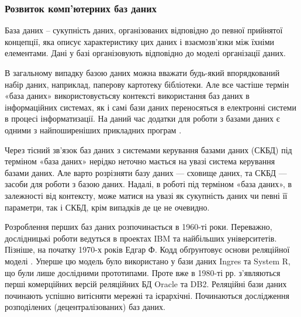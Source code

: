 \subsubsection{Розвиток комп’ютерних баз даних}

База даних – сукупність даних, організованих відповідно до певної прийнятої концепції, яка описує характеристику цих даних і взаємозв'язки між їхніми елементами. Дані у базі організовують відповідно до моделі організації даних. 

В загальному випадку базою даних можна вважати будь-який впорядкований набір даних, наприклад, паперову картотеку бібліотеки. Але все частіше термін «база даних» використовуєтьсяу контексті використання баз даних в інформаційних системах, як і самі бази даних переносяться в електронні системи в процесі інформатизації. На даний час додатки для роботи з базами даних є одними з найпоширеніших прикладних програм \cite{ситник2004проектування}.

Через тісний зв'язок баз даних з системами керування базами даних (СКБД) під терміном «база даних» нерідко неточно мається на увазі система керування базами даних. Але варто розрізняти базу даних — сховище даних, та СКБД — засоби для роботи з базою даних. Надалі, в роботі під терміном «база даних», в залежності від контексту, може матися на увазі як сукупність даних чи певні її параметри, так і СКБД, крім випадків де це не очевидно.

Розроблення перших баз даних розпочинається в 1960-ті роки. Переважно, дослідницькі роботи ведуться в проектах IBM та найбільших університетів. Пізніше, на початку 1970-х років Едгар Ф. Кодд обґрунтовує основи реляційної моделі \cite{codd1970relational}. Уперше цю модель було використано у бази даних Ingres та System R, що були лише дослідними прототипами. Проте вже в 1980-ті рр. з’являються перші комерційних версій реляційних БД Oracle та DB2. Реляційні бази даних починають успішно витісняти мережні та ієрархічні. Починаються дослідження розподілених (децентралізованих) баз даних.
